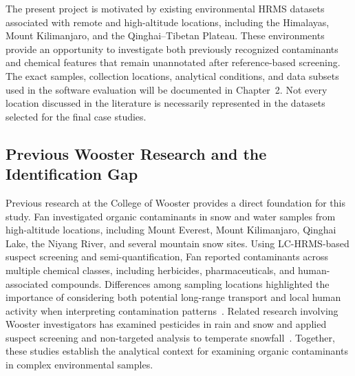        The present project is motivated by existing environmental HRMS datasets associated with remote and high-altitude locations, including the Himalayas, Mount Kilimanjaro, and the Qinghai--Tibetan Plateau. These environments provide an opportunity to investigate both previously recognized contaminants and chemical features that remain unannotated after reference-based screening. The exact samples, collection locations, analytical conditions, and data subsets used in the software evaluation will be documented in Chapter~2. Not every location discussed in the literature is necessarily represented in the datasets selected for the final case studies.

    \subsection{Previous Wooster Research and the Identification Gap}\label{subsec:wooster-research-gap}


       
        Previous research at the College of Wooster provides a direct foundation for this study. Fan investigated organic contaminants in snow and water samples from high-altitude locations, including Mount Everest, Mount Kilimanjaro, Qinghai Lake, the Niyang River, and several mountain snow sites. Using LC-HRMS-based suspect screening and semi-quantification, Fan reported contaminants across multiple chemical classes, including herbicides, pharmaceuticals, and human-associated compounds. Differences among sampling locations highlighted the importance of considering both potential long-range transport and local human activity when interpreting contamination patterns~\cite{Wenkai}. Related research involving Wooster investigators has examined pesticides in rain and snow and applied suspect screening and non-targeted analysis to temperate snowfall~\cite{Gray2022,NinoSuastegui2025}. Together, these studies establish the analytical context for examining organic contaminants in complex environmental samples.


